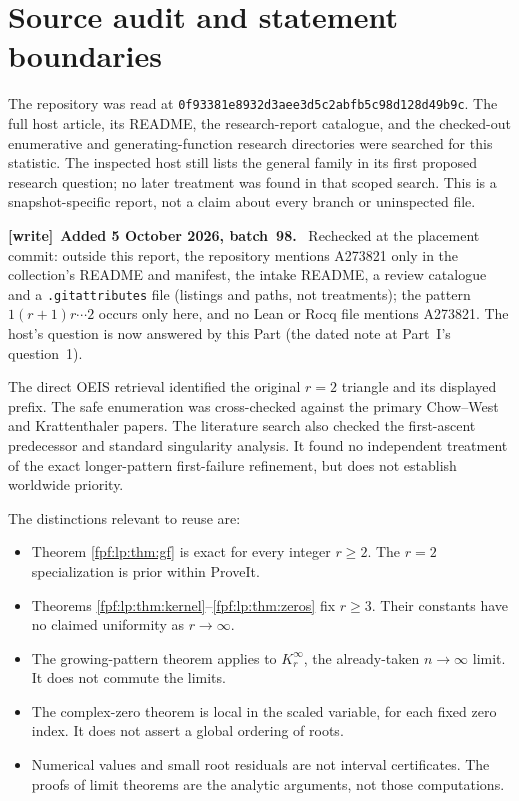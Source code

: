 \documentclass[11pt]{article}
\numberwithin{equation}{section}
\theoremstyle{definition}
\newenvironment{writenote}[1][]{\par\smallskip\begingroup\small
 \noindent\textbf{[write]}\if\relax\detokenize{#1}\relax\else~\textbf{#1.}\fi\ }%
 {\par\endgroup\smallskip}
\newcommand{\lprepo}{\texttt{0f93381e8932d3aee3d5c2abfb5c98d128d49b9c}}
\begin{document}
\section{Source audit and statement boundaries}
\label{fpf:lp:app:audit}

The repository was read at \lprepo. The full host article, its README,
the research-report catalogue, and the checked-out enumerative and
generating-function research directories were searched for this statistic.
The inspected host still lists the general family in its first proposed
research question; no later treatment was found in that scoped search.
This is a snapshot-specific report, not a claim about every branch or
uninspected file.

\begin{writenote}[Added 5 October 2026, batch~98]
Rechecked at the placement commit: outside this report, the repository
mentions A273821 only in the collection's README and manifest, the intake
README, a review catalogue and a \texttt{.gitattributes} file (listings and
paths, not treatments); the pattern
\(1(r+1)r\cdots2\) occurs only here, and no Lean or Rocq file mentions
A273821. The host's question is now answered by this Part (the dated note
at Part~I's question~1).
\end{writenote}

The direct OEIS retrieval identified the original \(r=2\) triangle and
its displayed prefix. The safe enumeration was cross-checked against
the primary Chow--West and Krattenthaler papers. The literature search
also checked the first-ascent predecessor and standard singularity
analysis. It found no independent treatment of the exact longer-pattern
first-failure refinement, but does not establish worldwide priority.

The distinctions relevant to reuse are:
\begin{itemize}[leftmargin=*]
\item Theorem \ref{fpf:lp:thm:gf} is exact for every integer \(r\ge2\).
The \(r=2\) specialization is prior within ProveIt.
\item Theorems \ref{fpf:lp:thm:kernel}--\ref{fpf:lp:thm:zeros} fix \(r\ge3\).
Their constants have no claimed uniformity as \(r\to\infty\).
\item The growing-pattern theorem applies to \(K_r^\infty\), the
already-taken \(n\to\infty\) limit. It does not commute the limits.
\item The complex-zero theorem is local in the scaled variable, for
each fixed zero index. It does not assert a global ordering of roots.
\item Numerical values and small root residuals are not interval
certificates. The proofs of limit theorems are the analytic arguments,
not those computations.
\end{itemize}
\end{document}
